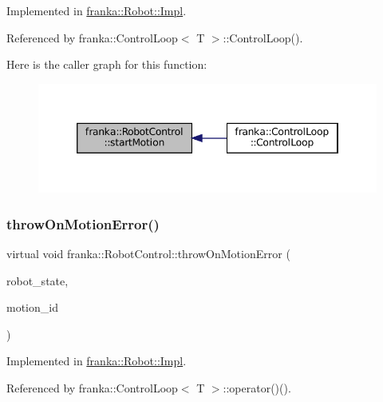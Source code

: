 Implemented in \hyperlink{classfranka_1_1Robot_1_1Impl_a2f4073ded9e7ecc118a93d233c0f6ed7}{franka\+::\+Robot\+::\+Impl}.



Referenced by franka\+::\+Control\+Loop$<$ T $>$\+::\+Control\+Loop().

Here is the caller graph for this function\+:
\nopagebreak
\begin{figure}[H]
\begin{center}
\leavevmode
\includegraphics[width=346pt]{classfranka_1_1RobotControl_a4a91a5baea3f7edc7eb094ef8208c065_icgraph}
\end{center}
\end{figure}
\mbox{\label{classfranka_1_1RobotControl_a796e9fb049ffc36ea44bec85f24e2fe4}} 
\subsubsection{\texorpdfstring{throw\+On\+Motion\+Error()}{throwOnMotionError()}}
{\footnotesize\ttfamily virtual void franka\+::\+Robot\+Control\+::throw\+On\+Motion\+Error (\begin{DoxyParamCaption}\item[{const \hyperlink{structfranka_1_1RobotState}{Robot\+State} \&}]{robot\+\_\+state,  }\item[{uint32\+\_\+t}]{motion\+\_\+id }\end{DoxyParamCaption})\hspace{0.3cm}{\ttfamily [pure virtual]}}



Implemented in \hyperlink{classfranka_1_1Robot_1_1Impl_ace3373a95db9754ab9df732d9b1dd1f6}{franka\+::\+Robot\+::\+Impl}.



Referenced by franka\+::\+Control\+Loop$<$ T $>$\+::operator()().

